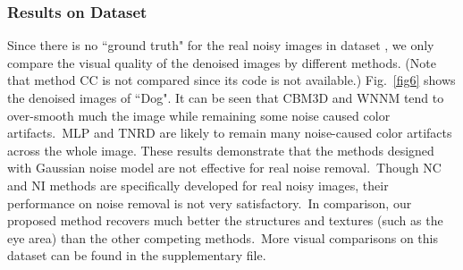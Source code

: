 \documentclass[10pt,twocolumn,letterpaper]{article}
\begin{document}
\vspace{-3mm}
\subsubsection{Results on Dataset \cite{ncwebsite}}\vspace{-1mm}

Since there is no ``ground truth" for the real noisy images in  dataset \cite{ncwebsite}, we only compare the visual quality of the denoised images by different methods. (Note that method CC \cite{crosschannel2016} is not compared since its code is not available.) Fig.\ \ref{fig6} shows the denoised images of ``Dog". It can be seen that CBM3D and WNNM tend to over-smooth much the image while remaining some noise caused color artifacts.\ MLP and TNRD are likely to remain many noise-caused color artifacts across the whole image. These results demonstrate that the methods designed with Gaussian noise model are not effective for real noise removal.\ Though NC and NI methods are specifically developed for real noisy images, their performance on noise removal is not very satisfactory.\ In comparison, our proposed method recovers much better the structures and textures (such as the eye area) than the other competing methods.\ More visual comparisons on this dataset \cite{ncwebsite} can be found in the supplementary file.
\end{document}
